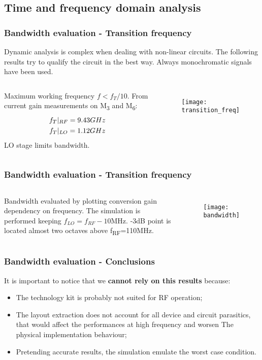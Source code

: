 \subsection{Time and frequency domain analysis}
\begin{frame}
\tableofcontents[currentsubsection]
\end{frame}

\begin{frame}
	\frametitle{Bandwidth evaluation - Transition frequency}
	Dynamic analysis is complex when dealing with non-linear circuits. The following results try to qualify the circuit in the best way.
	Always monochromatic signals have been used. 
	\begin{columns}
	Maximum working frequency $f<f_T/10$.
	From current gain measurements on M\textsubscript{3} and M\textsubscript{6}:
	\begin{gather}
		f_T|_{RF}=9.43GHz \notag \\
		f_T|_{LO}=1.12GHz \notag 
	\end{gather} 
	LO stage limits bandwidth. 
	\begin{figure}[H]
		\centering 
		\texttt{[image: transition\_freq]}
		\label{fig:ft}
	\end{figure}
	\end{columns}
\end{frame}

\begin{frame}
\frametitle{Bandwidth evaluation - Transition frequency}
\begin{columns}
	\column{0.4\textwidth}
	Bandwidth evaluated by plotting conversion gain dependency on frequency.
	The simulation is performed keeping \(f_{LO}=f_{RF}-10\)MHz.
	-3dB point is located almost two octaves above f\textsubscript{RF}=110MHz.
	
	\column{0.6\textwidth}
	\begin{figure}[H]
		\centering 
		\texttt{[image: bandwidth]}
		\label{fig:band}
	\end{figure}
\end{columns}
\end{frame}

\begin{frame}
	\frametitle{Bandwidth evaluation - Conclusions}
	It is important to notice that we \textbf{cannot rely on this results} because:
	\begin{itemize}
		\item The technology kit is probably not suited for RF operation;
		\item The layout extraction does not account for all device and circuit parasitics, that would affect the performances at high frequency and worsen The physical implementation behaviour;
		\item Pretending accurate results, the simulation emulate the worst case condition. 
	\end{itemize}
\end{frame}

